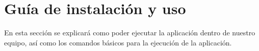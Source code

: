 
\chapter{Guía de instalación y uso} \label{chapter:GuiaUso}
En esta sección se explicará como poder ejecutar la aplicación dentro de nuestro equipo, así como 
los comandos básicos para la ejecución de la aplicación.

